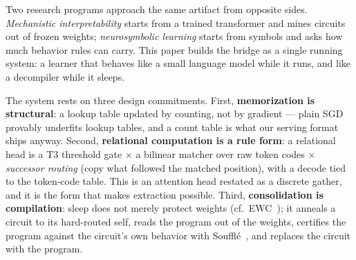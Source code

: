 \documentclass[sigconf,nonacm]{acmart}
\begin{document}
Two research programs approach the same artifact from opposite sides. \emph{Mechanistic
interpretability} starts from a trained transformer and mines circuits out of frozen weights;
\emph{neurosymbolic learning} starts from symbols and asks how much behavior rules can carry.
This paper builds the bridge as a single running system: a learner that behaves like a small
language model while it runs, and like a decompiler while it sleeps.

The system rests on three design commitments. First, \textbf{memorization is structural}: a
lookup table updated by counting, not by gradient --- plain SGD provably underfits lookup tables,
and a count table is what our serving format ships anyway. Second, \textbf{relational computation
is a rule form}: a relational head is a T3 threshold gate $\times$ a bilinear matcher over raw
token codes $\times$ \emph{successor routing} (copy what followed the matched position), with a
decode tied to the token-code table. This is an attention head restated as a discrete gather, and
it is the form that makes extraction possible. Third, \textbf{consolidation is compilation}: sleep
does not merely protect weights (cf.\ EWC~\cite{kirkpatrick2017ewc}); it anneals a circuit to its
hard-routed self, reads the program out of the weights, certifies the program against the
circuit's own behavior with Souffl\'e~\cite{jouppi2016souffle}, and replaces the circuit with the
program.
\end{document}
